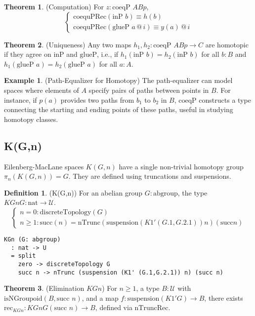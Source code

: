 \documentclass{article}
\theoremstyle{definition}
\newtheorem{theorem}{Theorem}
\newtheorem{definition}{Definition}
\newtheorem{example}{Example}
\begin{document}
\begin{theorem} (Computation)
For $z : \text{coeqP } A B p$,
\[
\begin{cases}
\text{coequPRec}(\text{inP } b) \equiv h(b) \\
\text{coequPRec}(\text{glueP } a \, @ \, i) \equiv y(a) \, @ \, i
\end{cases}
\]
\end{theorem}

\begin{theorem} (Uniqueness)
Any two maps $h_1, h_2 : \text{coeqP } A B p \to C$ are homotopic
if they agree on $\text{inP}$ and $\text{glueP}$, i.e.,
if $h_1(\text{inP } b) = h_2(\text{inP } b)$ for all $b : B$
and $h_1(\text{glueP } a) = h_2(\text{glueP } a)$ for all $a : A$.
\end{theorem}

\begin{example} (Path-Equalizer for Homotopy)
The path-equalizer can model spaces where elements of $A$ specify
pairs of paths between points in $B$. For instance, if $p(a)$ provides
two paths from $b_1$ to $b_2$ in $B$, $\text{coeqP}$ constructs a type
connecting the starting and ending points of these paths,
useful in studying homotopy classes.
\end{example}

\newpage

\subsection{K(G,n)}
Eilenberg-MacLane spaces $K(G,n)$ have a single non-trivial
homotopy group $\pi_n(K(G,n)) = G$. They are defined using truncations and suspensions.

\begin{definition} (K(G,n))
For an abelian group $G : \text{abgroup}$, the type $KGn G : \text{nat} \to \mathcal{U}$.
\[
\begin{cases}
n = 0: \text{discreteTopology}(G) \\
n \geq 1: \text{succ}(n) = \text{nTrunc}(\text{suspension}(K1' (G.1, G.2.1)) n) (\text{succ} n)
\end{cases}
\]
\begin{lstlisting}
KGn (G: abgroup)
  : nat -> U
  = split
    zero -> discreteTopology G
    succ n -> nTrunc (suspension (K1' (G.1,G.2.1)) n) (succ n)
\end{lstlisting}
\end{definition}

\begin{theorem} (Elimination $KGn$)
For $n \geq 1$, a type $B : \mathcal{U}$ with $\text{isNGroupoid}(B, \text{succ } n)$,
and a map $f : \text{suspension}(K1' G) \to B$, there
exists $\text{rec}_{KGn} : KGn G (\text{succ } n) \to B$,
defined via $\text{nTruncRec}$.
\end{theorem}
\end{document}
